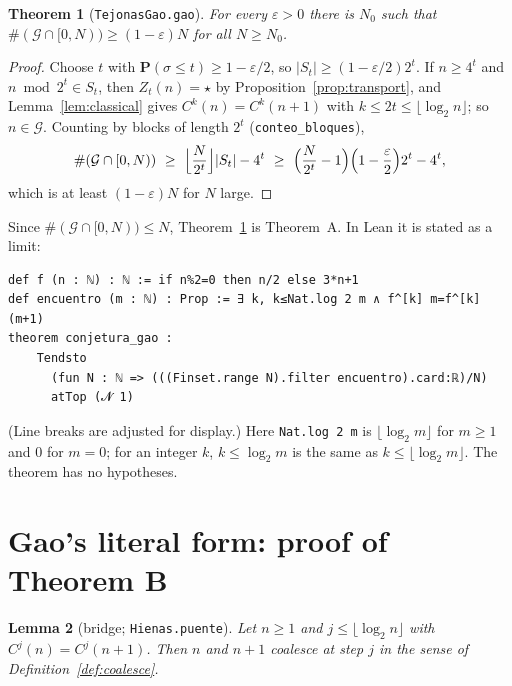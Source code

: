 \documentclass[11pt]{amsart}
\newtheorem{theorem}{Theorem}[section]
\newtheorem{lemma}[theorem]{Lemma}
\theoremstyle{definition}
\theoremstyle{remark}
\newcommand{\Prob}{\mathbf{P}}
\newcommand{\fus}{\star}
\newcommand{\lean}[1]{\nolinkurl{#1}}
\begin{document}
\begin{theorem}[\lean{TejonasGao.gao}]\label{thm:density}
For every $\varepsilon>0$ there is $N_0$ such that $\#(\mathcal G\cap[0,N))\ge(1-\varepsilon)N$ for all $N\ge N_0$.
\end{theorem}

\begin{proof}
Choose $t$ with $\Prob(\sigma\le t)\ge 1-\varepsilon/2$, so $|S_t|\ge(1-\varepsilon/2)2^t$. If $n\ge 4^t$ and $n\bmod 2^t\in S_t$, then $Z_t(n)=\fus$ by Proposition~\ref{prop:transport}, and Lemma~\ref{lem:classical} gives $C^{k}(n)=C^{k}(n+1)$ with $k\le 2t\le\lfloor\log_2 n\rfloor$; so $n\in\mathcal G$. Counting by blocks of length $2^t$ (\lean{conteo_bloques}),
\[
\#(\mathcal G\cap[0,N))\ \ge\ \Bigl\lfloor \frac N{2^t}\Bigr\rfloor |S_t|-4^t\ \ge\ \Bigl(\frac N{2^t}-1\Bigr)\Bigl(1-\frac\varepsilon2\Bigr)2^t-4^t,
\]
which is at least $(1-\varepsilon)N$ for $N$ large.
\end{proof}

Since $\#(\mathcal G\cap[0,N))\le N$, Theorem~\ref{thm:density} is Theorem~A. In Lean it is stated as a limit:

\begin{Verbatim}[fontsize=\small]
def f (n : ℕ) : ℕ := if n%2=0 then n/2 else 3*n+1
def encuentro (m : ℕ) : Prop := ∃ k, k≤Nat.log 2 m ∧ f^[k] m=f^[k] (m+1)
theorem conjetura_gao :
    Tendsto
      (fun N : ℕ => (((Finset.range N).filter encuentro).card:ℝ)/N)
      atTop (𝓝 1)
\end{Verbatim}

\noindent (Line breaks are adjusted for display.) Here \texttt{Nat.log 2 m} is $\lfloor\log_2 m\rfloor$ for $m\ge1$ and $0$ for $m=0$; for an integer $k$, $k\le\log_2 m$ is the same as $k\le\lfloor\log_2 m\rfloor$. The theorem has no hypotheses.

\section{Gao's literal form: proof of Theorem B}\label{sec:literal}

\begin{lemma}[bridge; \lean{Hienas.puente}]\label{lem:bridge}
Let $n\ge1$ and $j\le\lfloor\log_2 n\rfloor$ with $C^{j}(n)=C^{j}(n+1)$. Then $n$ and $n+1$ coalesce at step $j$ in the sense of Definition~\ref{def:coalesce}.
\end{lemma}
\end{document}
